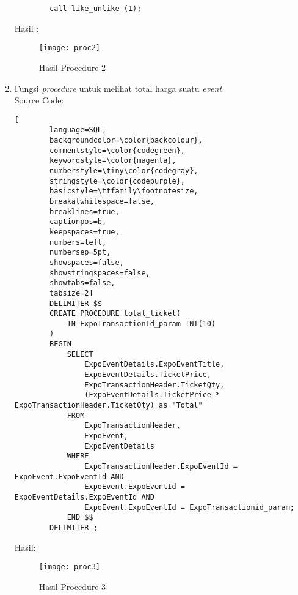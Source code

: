 \begin{enumerate}
\begin{lstlisting}
		call like_unlike (1);
	\end{lstlisting}
	Hasil : 
	\\
	\begin{figure}[H]
		\centering
		\texttt{[image: proc2]}
		\caption{Hasil Procedure 2}
	\end{figure}
	
	\item 	Fungsi \textit{procedure} untuk melihat total harga suatu \textit{event} \\
	Source Code:
	\begin{lstlisting}[
		language=SQL,
		backgroundcolor=\color{backcolour},   
		commentstyle=\color{codegreen},
		keywordstyle=\color{magenta},
		numberstyle=\tiny\color{codegray},
		stringstyle=\color{codepurple},
		basicstyle=\ttfamily\footnotesize,
		breakatwhitespace=false,         
		breaklines=true,                 
		captionpos=b,                    
		keepspaces=true,                 
		numbers=left,                    
		numbersep=5pt,                  
		showspaces=false,                
		showstringspaces=false,
		showtabs=false,                  
		tabsize=2]
		DELIMITER $$
		CREATE PROCEDURE total_ticket(
			IN ExpoTransactionId_param INT(10)
		)
		BEGIN
			SELECT
				ExpoEventDetails.ExpoEventTitle,
				ExpoEventDetails.TicketPrice,
				ExpoTransactionHeader.TicketQty,
				(ExpoEventDetails.TicketPrice * ExpoTransactionHeader.TicketQty) as "Total"
			FROM 
				ExpoTransactionHeader,
				ExpoEvent,
				ExpoEventDetails
			WHERE
				ExpoTransactionHeader.ExpoEventId = ExpoEvent.ExpoEventId AND
				ExpoEvent.ExpoEventId = ExpoEventDetails.ExpoEventId AND
				ExpoEvent.ExpoEventId = ExpoTransactionid_param;
			END $$
		DELIMITER ;
	\end{lstlisting}
	Hasil:
	\\
	\begin{figure}[H]
		\centering
		\texttt{[image: proc3]}
		\caption{Hasil Procedure 3}
	\end{figure}


\end{enumerate}
